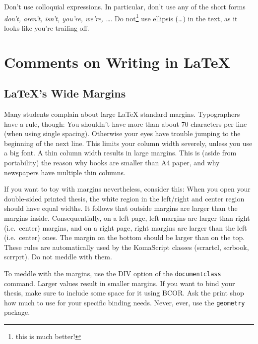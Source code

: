 \documentclass[../{{cookiecutter.project_slug}}.tex]{subfiles}
\begin{document}
    Don't use colloquial expressions.  In particular, don't use any of the 
    short forms  \emph{don't, aren't,  isn't, you're, we're,  \ldots}.  Do 
    not\footnote{this is much better!} use  ellipsis (\ldots) in the text, 
    as it looks like you're trailing off.                                  

    \chapter{Comments on Writing in LaTeX}

    \section{\LaTeX{}'s Wide Margins}

    Many students  complain  about  large  \LaTeX{}  standard  margins. 
    Typographers have a  rule, though: You shouldn't have  more than about 
    70 characters  per line (when  using single spacing).   Otherwise your 
    eyes have  trouble jumping to  the beginning  of the next  line.  This 
    limits  your column  width severely,  unless you  use a  big font.   A 
    thin  column width  results in  large  margins.  This  is (aside  from 
    portability) the reason  why books are smaller than A4  paper, and why 
    newspapers have multiple thin columns.                                 

    If  you want  to toy  with margins  nevertheless, consider  this: When 
    you  open  your  double-sided  printed thesis,  the  white  region  in 
    the  left/right  and  center  region should  have  equal  widths.   It 
    follows  that outside  margins  are larger  than  the margins  inside. 
    Consequentially, on  a left page,  left margins are larger  than right 
    (i.e.\ center) margins, and on a  right page, right margins are larger 
    than the left (i.e.\ center) ones. The  margin on the bottom should be 
    larger than  on the top.   These rules  are automatically used  by the 
    KomaScript classes  (scrartcl, scrbook, scrrprt).  Do  not meddle with 
    them.                                                                  
    
    To   meddle  with   the   margins,   use  the   DIV   option  of   the 
    \verb+documentclass+  command.    Larger  values  result   in  smaller 
    margins.  If you  want to bind your thesis, make  sure to include some 
    space for  it using BCOR\@.   Ask the print shop  how much to  use for 
    your  specific binding  needs.  Never,  ever, use  the \verb+geometry+ 
    package.                                                               
\end{document}
